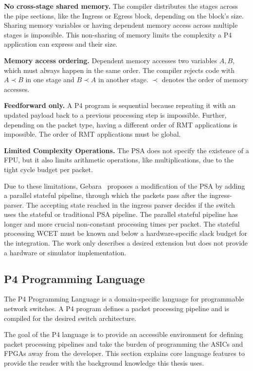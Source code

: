 \textbf{No cross-stage shared memory.} The compiler distributes the stages across the pipe sections, like the Ingress or Egress block, depending on the block's size. Sharing memory variables or having dependent memory access across multiple stages is impossible. This non-sharing of memory limits the complexity a P4 application can express and their size.

\textbf{Memory access ordering.} Dependent memory accesses two variables $A, B$, which must always happen in the same order. The compiler rejects code with $A \prec B$ in one stage and $B \prec A$ in another stage. $\prec$ denotes the order of memory accesses.

\textbf{Feedforward only.} A P4 program is sequential because repeating it with an updated payload back to a previous processing step is impossible. Further, depending on the packet type, having a different order of \ac{RMT} applications is impossible. The order of \ac{RMT} applications must be global.

\textbf{Limited Complexity Operations.} The \ac{PSA} does not specify the existence of a \ac{FPU}, but it also limits arithmetic operations, like multiplications, due to the tight cycle budget per packet.

Due to these limitations, Gebara~\etal{} proposes a modification of the \ac{PSA} by adding a parallel stateful pipeline, through which the packets pass after the ingress-parser. The accepting state reached in the ingress parser decides if the switch uses the stateful or traditional \ac{PSA} pipeline. The parallel stateful pipeline has longer and more crucial non-constant processing times per packet. The stateful processing \ac{WCET} must be known and below a hardware-specific slack budget for the integration. The work only describes a desired extension but does not provide a hardware or simulator implementation.

\subsection{P4 Programming Language}\label{sec:p4}

The P4 Programming Language is a domain-specific language for programmable network switches. A P4 program defines a packet processing pipeline and is compiled for the desired switch architecture.

The goal of the P4 language is to provide an accessible environment for defining packet processing pipelines and take the burden of programming the \acp{ASIC} and \acp{FPGA} away from the developer. This section explains core language features to provide the reader with the background knowledge this thesis uses.

